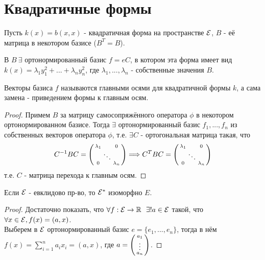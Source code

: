 \section{Квадратичные формы}
Пусть $k(x) = b(x,x)$ - квадратичная форма на пространстве $\mathcal{E}$, $B$ - её матрица в некотором базисе ($B^T = B$).
\begin{theorem}
    В $B \ \exists$ ортонормированный базис $f = eC$, в котором эта форма имеет вид $k(x) = \lambda_1y_1^2 + ... + \lambda_n y_n^2$, где $\lambda_1,...,\lambda_n$ - собственные значения $B$.
\end{theorem}
\begin{remark}
    Векторы базиса $f$ называются главными осями для квадратичной формы $k$, а сама замена - приведением формы к главным осям. 
\end{remark}
\begin{proof}
    Примем $B$ за матрицу самосопряжённого оператора $\phi$ в некотором ортонормированном базисе. Тогда $\exists$ ортонормированный базис $f_1,...,f_n$ из собственных векторов оператора $\phi$, т.е. $\exists C$ - ортогональная матрица такая, что
    $$C^{-1}BC = \begin{psmallmatrix}  \lambda_1&\null&0 \\ \null&\ddots&\null \\ 0&\null&\lambda_n \end{psmallmatrix} \Longrightarrow C^TBC = \begin{psmallmatrix}  \lambda_1&\null&0 \\ \null&\ddots&\null \\ 0&\null&\lambda_n \end{psmallmatrix}$$
    т.е. $C$ - матрица перехода к главным осям. 
\end{proof}
\begin{subtheorem}
    Если $\mathcal{E}$ - евклидово пр-во, то $\mathcal{E}^*$ изоморфно $E$.
\end{subtheorem}
\begin{proof}
    Достаточно показать, что $\forall f: \mathcal{E} \rightarrow \mathbb{R} \ \ \exists! a \in \mathcal{E}$ такой, что $\forall x \in \mathcal{E}, f(x) = (a, x)$.\\
    Выберем в $\mathcal{E}$ ортонормированный базис $e = \{e_1,...,e_n\}$, тогда в нём $f(x) = \sum \limits_{i=1}^n a_ix_i = (a, x)$, где $a = \begin{psmallmatrix} a_1 \\ \vdots \\ a_n \end{psmallmatrix}$.
\end{proof}
